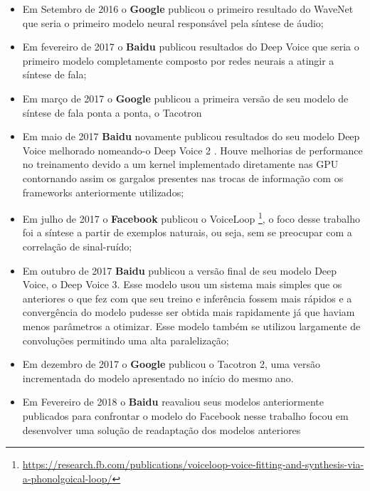 \begin{itemize}
    \item Em Setembro de 2016 o \textbf{Google} publicou o primeiro resultado do WaveNet \cite{wavenet} que seria o primeiro modelo neural responsável pela síntese de áudio;
    \item Em fevereiro de 2017 o \textbf{Baidu} publicou resultados do Deep Voice \cite{deepVoice} que seria o primeiro modelo completamente composto por redes neurais a atingir a síntese de fala;
    \item Em março de 2017 o \textbf{Google} publicou a primeira versão de seu modelo de síntese de fala ponta a ponta, o Tacotron \cite{tacotron}
    \item Em maio de 2017 \textbf{Baidu} novamente publicou resultados do seu modelo Deep Voice melhorado nomeando-o Deep Voice 2 \cite{deepVoice2}. Houve melhorias de performance no treinamento devido a um kernel implementado diretamente nas GPU contornando assim os gargalos presentes nas trocas de informação com os frameworks anteriormente utilizados;
    \item Em julho de 2017 o \textbf{Facebook} publicou o VoiceLoop \cite{facebook:DBLP:journals/corr/TaigmanWPN17}\footnote{\url{https://research.fb.com/publications/voiceloop-voice-fitting-and-synthesis-via-a-phonolgoical-loop/}}, o foco desse trabalho foi a síntese a partir de exemplos naturais, ou seja, sem se preocupar com a correlação de sinal-ruído;
    \item Em outubro de 2017 \textbf{Baidu} publicou a versão final de seu modelo Deep Voice, o Deep Voice 3. Esse modelo usou um sistema mais simples que os anteriores o que fez com que seu treino e inferência fossem mais rápidos e a convergência do modelo pudesse ser obtida mais rapidamente já que haviam menos parâmetros a otimizar. Esse modelo também se utilizou largamente de convoluções permitindo uma alta paralelização;
    \item Em dezembro de 2017 o \textbf{Google} publicou o Tacotron 2\cite{tacotron2:DBLP:journals/corr/abs-1712-05884}, uma versão incrementada do modelo apresentado no início do mesmo ano.
    \item Em Fevereiro de 2018 o \textbf{Baidu} \cite{baidu_voice_clonning:DBLP:journals/corr/abs-1802-06006} reavaliou seus modelos anteriormente publicados para confrontar o modelo do Facebook nesse trabalho focou em desenvolver uma solução de readaptação dos modelos anteriores
\end{itemize}

